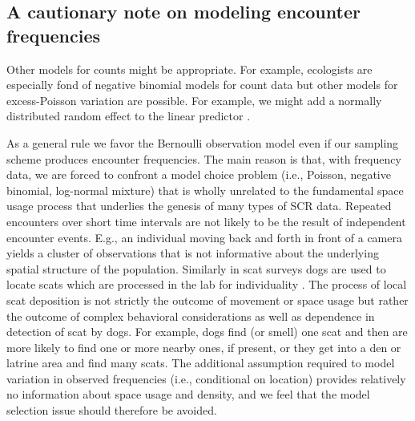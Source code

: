\subsection{A cautionary note on modeling encounter frequencies}

Other models for counts might be appropriate. For example, ecologists
are especially fond of negative binomial models for count data
\citep{verhoef_boveng:2007,white_bennetts:1996,kery_etal:2005}
but other models for excess-Poisson variation are possible. For
example, we might add a normally distributed random effect to
the linear predictor \citep{coull_agresti:1999}.

As a general rule we favor the Bernoulli observation model even if
our sampling scheme produces encounter frequencies. The main reason is
that, with frequency data, we are forced to confront a model choice
problem (i.e., Poisson, negative binomial, log-normal mixture) that is
wholly unrelated to the fundamental space usage process that underlies
the genesis  %
of many types of SCR data.
Repeated encounters over short time intervals
are not likely to be the result of independent encounter events. E.g.,
an individual moving back and forth in front of a camera yields a
cluster of observations that is not informative about the underlying
spatial structure of the population. Similarly in scat surveys dogs
are used to locate scats which are processed in the lab for
individuality \citep{kohn_etal:1999, mackay_etal:2008,
  thompson_etal:2012}.  The process of local scat deposition is not
strictly the outcome of movement or space usage but rather the outcome
of complex behavioral considerations as well as dependence in
detection of scat by dogs.
For example, dogs find (or smell) one scat and
then are more likely to find one or more nearby ones, if present, or
they get into a den or latrine area and find many scats.  The
additional assumption required to model variation in observed
frequencies (i.e., conditional on location) provides relatively no
information about space usage and density, and we feel that the model
selection issue should therefore be avoided.

